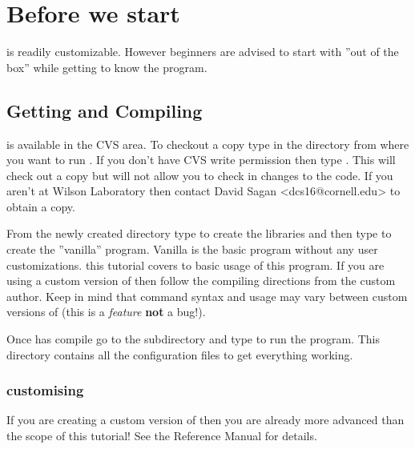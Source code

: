 \documentclass{book}
\begin{document}
\setlength{\parskip}{\dPar}
\setlength{\parindent}{0ex}

\chapter{Before we start}
\label{c:before_beginning}

\tao is readily customizable. However beginners are advised to start with
''out of the box'' \tao while getting to know the program.

\section{Getting and Compiling \tao}

\tao is available in the \cesr CVS area. To checkout a copy type  in the directory from where you want to run \tao. If you don't have \cesr
CVS write permission then type . This will check out a copy
but will not allow you to check in changes to the code. If you aren't at Wilson
Laboratory then contact David Sagan <dcs16@cornell.edu> to obtain a copy. 

From the newly created  directory type  to create the
libraries and then type  to create
the ''vanilla'' \tao program. Vanilla \tao is the basic \tao program without any
user customizations. this tutorial covers to basic usage of this program.
If you are using a custom version of \tao then
follow the compiling directions from the custom \tao author. Keep in mind that
command syntax and usage may vary between custom versions of \tao (this is a
\textit{feature} \textbf{not} a bug!).

Once \tao has compile go to the subdirectory  and type
 to run the program. This directory contains all the
configuration files to get everything working.

\subsection{customising \tao}

If you are creating a custom version of \tao then you are already more advanced than
the scope of this tutorial! See the \tao Reference Manual for details.

\end{document}
